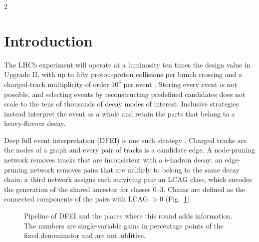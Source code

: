 \documentclass[10pt]{article}
\begin{document}
\vspace{0.5em}
\begin{multicols}{2}

\section{Introduction}

The LHCb experiment will operate at a luminosity ten times the design value in Upgrade II, with up to fifty proton-proton collisions per bunch crossing and a charged-track multiplicity of order $10^3$ per event \cite{upgrade2}. Storing every event is not possible, and selecting events by reconstructing predefined candidates does not scale to the tens of thousands of decay modes of interest. Inclusive strategies instead interpret the event as a whole and retain the parts that belong to a heavy-flavour decay.

Deep full event interpretation (DFEI) is one such strategy \cite{dfei,hgnn}. Charged tracks are the nodes of a graph and every pair of tracks is a candidate edge. A node-pruning network removes tracks that are inconsistent with a $b$-hadron decay; an edge-pruning network removes pairs that are unlikely to belong to the same decay chain; a third network assigns each surviving pair an LCAG class, which encodes the generation of the shared ancestor for classes 0--3. Chains are defined as the connected components of the pairs with LCAG $>0$ (Fig.~\ref{fig:pipe}).

\begin{figure}[H]
\centering
{}
\caption{Pipeline of DFEI and the places where this round adds information. The numbers are single-variable gains in percentage points of the fixed denominator and are not additive.}
\label{fig:pipe}
\end{figure}


\end{multicols}
\end{document}
